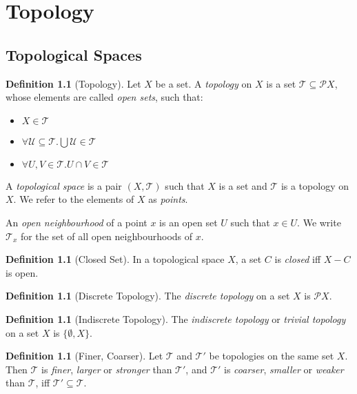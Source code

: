 \documentclass{book}
\theoremstyle{definition}
\newtheorem{df}[ax]{Definition}
\begin{document}
\chapter{Topology}

\section{Topological Spaces}

\begin{df}[Topology]
Let $X$ be a set. A \emph{topology} on $X$ is a set $\mathcal{T} \subseteq \mathcal{P} X$, whose elements are called \emph{open sets}, such that:
\begin{itemize}
\item $X \in \mathcal{T}$
\item $\forall \mathcal{U} \subseteq \mathcal{T}. \bigcup \mathcal{U} \in \mathcal{T}$
\item $\forall U,V \in \mathcal{T}. U \cap V \in \mathcal{T}$
\end{itemize}
A \emph{topological space} is a pair $(X, \mathcal{T})$ such that $X$ is a set and $\mathcal{T}$ is a topology on $X$. We refer to the elements of $X$ as \emph{points}.

An \emph{open neighbourhood} of a point $x$ is an open set $U$ such that $x \in U$. We write $\mathcal{T}_x$ for the set of all open neighbourhoods of $x$.
\end{df}

\begin{df}[Closed Set]
In a topological space $X$, a set $C$ is \emph{closed} iff $X - C$ is open.
\end{df}

\begin{df}[Discrete Topology]
The \emph{discrete topology} on a set $X$ is $\mathcal{P} X$.
\end{df}

\begin{df}[Indiscrete Topology]
The \emph{indiscrete topology} or \emph{trivial topology} on a set $X$ is $\{ \emptyset, X \}$.
\end{df}

\begin{df}[Finer, Coarser]
Let $\mathcal{T}$ and $\mathcal{T}'$ be topologies on the same set $X$. Then $\mathcal{T}$ is \emph{finer}, \emph{larger} or \emph{stronger} than $\mathcal{T}'$, and $\mathcal{T}'$ is \emph{coarser}, \emph{smaller} or \emph{weaker} than $\mathcal{T}$, iff $\mathcal{T}' \subseteq \mathcal{T}$.
\end{df}
\end{document}
